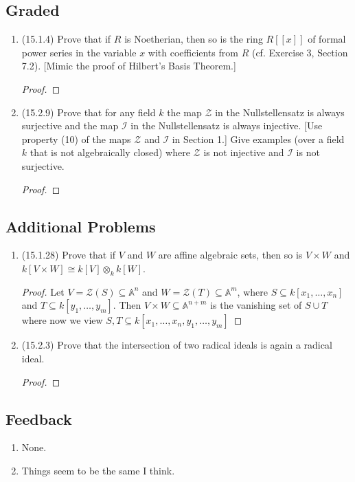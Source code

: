 \documentclass[11pt]{article}
\begin{document}
\subsection*{Graded}
\begin{enumerate}
    \item (15.1.4) Prove that if $R$ is Noetherian, then so is the ring $R[[x]]$ of formal power series in the variable $x$ with coefficients from $R$ (cf. Exercise 3, Section 7.2). [Mimic the proof of Hilbert's Basis Theorem.] \begin{proof}
        
    \end{proof}
    \item (15.2.9) Prove that for any field $k$ the map $\mathcal{Z}$ in the Nullstellensatz is always surjective and the map $\mathcal{I}$ in the Nullstellensatz is always injective. [Use property (10) of the maps $\mathcal{Z}$ and $\mathcal{I}$ in Section 1.] Give examples (over a field $k$ that is not algebraically closed) where $\mathcal{Z}$ is not injective and $\mathcal{I}$ is not surjective. \begin{proof}
        
    \end{proof}
\end{enumerate}
\subsection*{Additional Problems}
\begin{enumerate}
    \item (15.1.28) Prove that if $V$ and $W$ are affine algebraic sets, then so is $V\times W$ and $k[V\times W]\cong k[V]\otimes_kk[W]$. \begin{proof}
        Let $V = \mathcal{Z}(S)\subseteq \mathbb{A}^n$ and $W = \mathcal{Z}(T)\subseteq \mathbb{A}^m$, where $S\subseteq k[x_1,\dots,x_n]$ and $T\subseteq k[y_1,\dots,y_m]$. Then $V\times W \subseteq \mathbb{A}^{n+m}$ is the vanishing set of $S\cup T$ where now we view $S,T\subseteq k[x_1,\dots,x_n,y_1,\dots,y_m]$
    \end{proof}
    \item (15.2.3) Prove that the intersection of two radical ideals is again a radical ideal. \begin{proof}
        
    \end{proof}
\end{enumerate}
\subsection*{Feedback}
\begin{enumerate}
    \item None.
    \item Things seem to be the same I think.
\end{enumerate}
\end{document}
